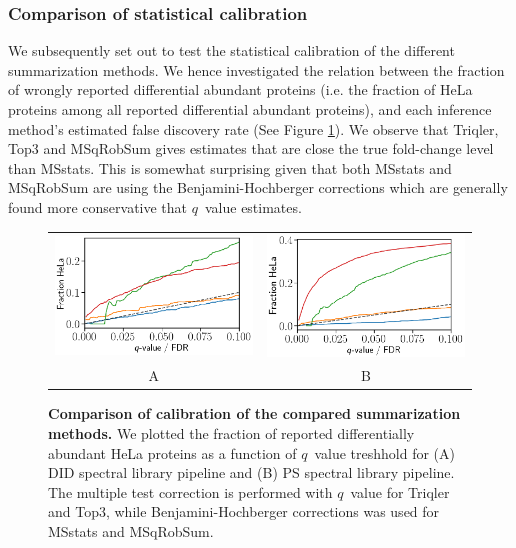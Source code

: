 \documentclass[10pt,letterpaper]{article}
\begin{document}
\subsubsection*{Comparison of statistical calibration}

We subsequently set out to test the statistical calibration of the different summarization methods. We hence investigated the relation between the fraction of wrongly reported differential abundant proteins (i.e. the fraction of HeLa proteins among all reported differential abundant proteins), and each inference method's estimated false discovery rate (See Figure \ref{fig:frac_hela_vs_fdr}). We observe that Triqler, Top3 and MSqRobSum gives estimates that are close the true fold-change level than MSstats. This is somewhat surprising given that both MSstats and MSqRobSum are using the Benjamini-Hochberger corrections which are generally found more conservative that $q$~value estimates.


\begin{figure}[hbt]
    \centering
    \begin{tabular}{cc} 
        \includegraphics[width=0.5\linewidth]{../../result/report_plots_filtered/osw_FP_DE_all.png} & 
        \includegraphics[width=0.5\linewidth]{../../result/report_plots_filtered/diann_FP_DE_all.png} \\
        A & B
    \end{tabular}
  \caption{{\bf Comparison of calibration of the compared summarization methods.} We plotted the fraction of reported differentially abundant HeLa proteins as a function of $q$~value treshhold for (A) DID spectral library pipeline and (B) PS spectral library pipeline. The multiple test correction is performed with $q$~value for Triqler and Top3, while Benjamini-Hochberger corrections was used for MSstats and MSqRobSum. \label{fig:frac_hela_vs_fdr}}
\end{figure}
\end{document}
